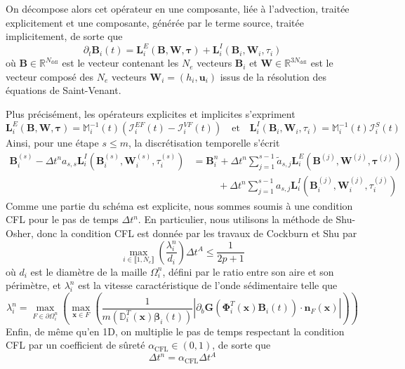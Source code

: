 \documentclass[11pt, a4paper, oneside]{report}
\begin{document}
\begin{samepage}
On décompose alors cet opérateur en une composante, liée à l'advection, traitée explicitement et une composante, générée par le terme source, traitée implicitement, de sorte que
\begin{equation}
    \partial_t \bm{B}_i(t) = \bm{L}_i^E(\bm{B}, \bm{W}, \bm{\tau}) + \bm{L}_i^I(\bm{B}_i, \bm{W}_i, \tau_i)
\end{equation}
où $\bm{B} \in \mathbb{R}^{N_\text{ddl}}$ est le vecteur contenant les $N_e$  vecteurs $\bm{B}_i$ et $\bm{W} \in \mathbb{R}^{3N_\text{ddl}}$ est le vecteur composé des $N_e$ vecteurs $\bm{W}_i = (h_i, \bm{u}_i)$ issus de la résolution des équations de Saint-Venant. \\
\end{samepage}
Plus précisément, les opérateurs explicites et implicites s'expriment
\begin{equation}
    \bm{L}_i^E(\bm{B}, \bm{W}, \bm{\tau}) = \mathbb{M}_i^{-1}(t) \left( \bm{\mathcal{I}}_i^{EF}(t) - \bm{\mathcal{I}}_i^{VF}(t) \right) \quad \text{et} \quad
    \bm{L}_i^I(\bm{B}_i, \bm{W}_i, \tau_i) = \mathbb{M}_i^{-1}(t) \bm{\mathcal{I}}_i^S(t)
\end{equation}
Ainsi, pour une étape $s \leq m$, la discrétisation temporelle s'écrit
\begin{equation}
    \begin{aligned}
        \bm{B}_i^{(s)} - \Delta t^n a_{s, s} \bm{L}_i^I \left( \bm{B}_i^{(s)}, \bm{W}_i^{(s)}, \tau_i^{(s)} \right) & = \bm{B}_i^n + \Delta t^n \sum_{j = 1}^{s-1} \widetilde{a}_{s, j} \bm{L}_i^E \left( \bm{B}^{(j)}, \bm{W}^{(j)}, \bm{\tau}^{(j)} \right) \\
        & \phantom{bm{B}_i^n } + \Delta t^n \sum_{j = 1}^{s-1} a_{s, j} \bm{L}_i^I \left( \bm{B}_i^{(j)}, \bm{W}_i^{(j)}, \tau_i^{(j)} \right)
    \end{aligned}
\end{equation}
Comme une partie du schéma est explicite, nous sommes soumis à une condition CFL pour le pas de temps $\Delta t^n$. En particulier, nous utilisons la méthode de Shu-Osher, donc la condition CFL est donnée par les travaux de Cockburn et Shu \cite{cockburn2001runge} par
\begin{equation}
    \max_{i \in \llbracket 1, N_e \rrbracket} \left( \frac{\lambda_i^n}{d_i} \right) \Delta t^A \leq \frac{1}{2p+1}
\end{equation}
où $d_i$ est le diamètre de la maille $\Omega_i^n$, défini par le ratio entre son aire et son périmètre, et $\lambda_i^n$ est la vitesse caractéristique de l'onde sédimentaire telle que
\begin{equation}
    \lambda_i^n = \max_{F \in \partial \Omega_i^n} \left( \max_{\bm{x} \in F} \left( \frac{1}{m \left( \mathbb{D}_i^T(\bm{x}) \bm{\beta}_i(t) \right)} \left| \partial_b \bm{G} \left( \bm{\Phi}_i^T(\bm{x}) \bm{B}_i(t) \right) \cdot \bm{n}_F(\bm{x}) \right| \right) \right)
\end{equation}
Enfin, de même qu'en 1D, on multiplie le pas de temps respectant la condition CFL par un coefficient de sûreté $\alpha_\text{CFL} \in (0, 1)$, de sorte que
\begin{equation}
    \Delta t^n = \alpha_\text{CFL} \Delta t^A
\end{equation}
\end{document}
